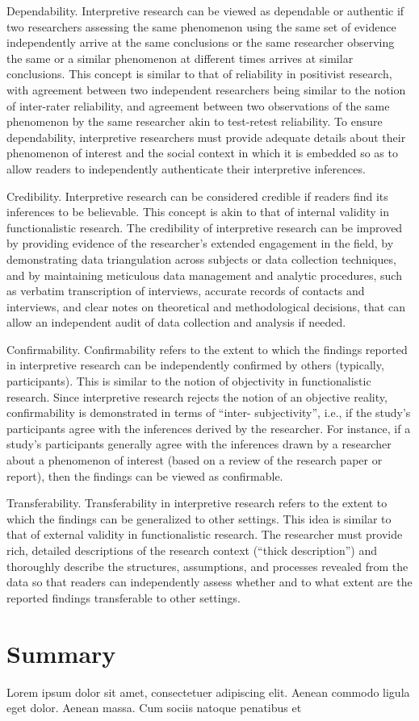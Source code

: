 Dependability. Interpretive research can be viewed as dependable or authentic if two researchers assessing the same phenomenon using the same set of evidence independently arrive at the same conclusions or the same researcher observing the same or a similar phenomenon at different times arrives at similar conclusions. This concept is similar to that of reliability in positivist research, with agreement between two independent researchers being similar to the notion of inter-rater reliability, and agreement between two observations of the same phenomenon by the same researcher akin to test-retest reliability. To ensure dependability, interpretive researchers must provide adequate details about their phenomenon of interest and the social context in which it is embedded so as to allow readers to independently authenticate their interpretive inferences.

Credibility. Interpretive research can be considered credible if readers find its inferences to be believable. This concept is akin to that of internal validity in functionalistic research. The credibility of interpretive research can be improved by providing evidence of the researcher’s extended engagement in the field, by demonstrating data triangulation across subjects or data collection techniques, and by maintaining meticulous data management and analytic procedures, such as verbatim transcription of interviews, accurate records of contacts and interviews, and clear notes on theoretical and methodological decisions, that can allow an independent audit of data collection and analysis if needed.

Confirmability. Confirmability refers to the extent to which the findings reported in interpretive research can be independently confirmed by others (typically, participants). This is similar to the notion of objectivity in functionalistic research. Since interpretive research rejects the notion of an objective reality, confirmability is demonstrated in terms of “inter- subjectivity”, i.e., if the study’s participants agree with the inferences derived by the researcher. For instance, if a study’s participants generally agree with the inferences drawn by a researcher about a phenomenon of interest (based on a review of the research paper or report), then the findings can be viewed as confirmable.

Transferability. Transferability in interpretive research refers to the extent to which the findings can be generalized to other settings. This idea is similar to that of external validity in functionalistic research. The researcher must provide rich, detailed descriptions of the research context (“thick description”) and thoroughly describe the structures, assumptions, and processes revealed from the data so that readers can independently assess whether and to what extent are the reported findings transferable to other settings.


\section{Summary}\label{ch11:summary}

Lorem ipsum dolor sit amet, consectetuer adipiscing elit. Aenean commodo ligula eget dolor. Aenean massa. Cum sociis natoque penatibus et
